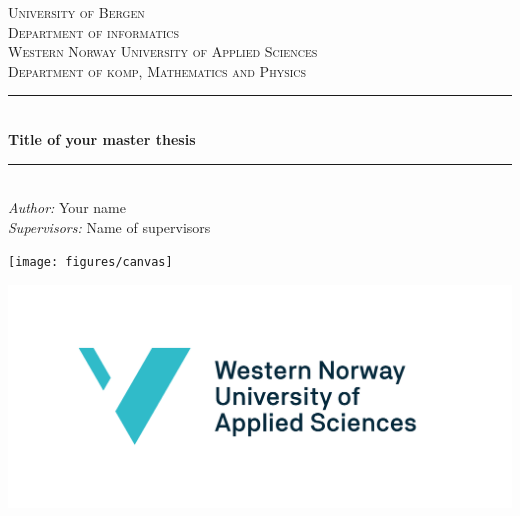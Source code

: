 \begin{titlepage}

\newcommand{\HRule}{\rule{\linewidth}{0.5mm}} %

\center %


\textsc{\large University of Bergen \\ Department of informatics}\\[0.5cm] %
\textsc{\large Western Norway University of Applied Sciences \\ Department of
komp, Mathematics and Physics}\\[1.5cm]


\HRule \\[1.5cm]
{ \huge \bfseries Title of your master thesis}\\[0.7cm] %
\HRule \\[0.5cm]


\large \emph{Author:} Your name\\
\large \emph{Supervisors:} Name of supervisors\\[2cm]


\centerline{\texttt{[image: figures/canvas]}}  %
\centerline{\includegraphics[scale=0.3]{figures/hvlEnglish}}


\end{titlepage}
